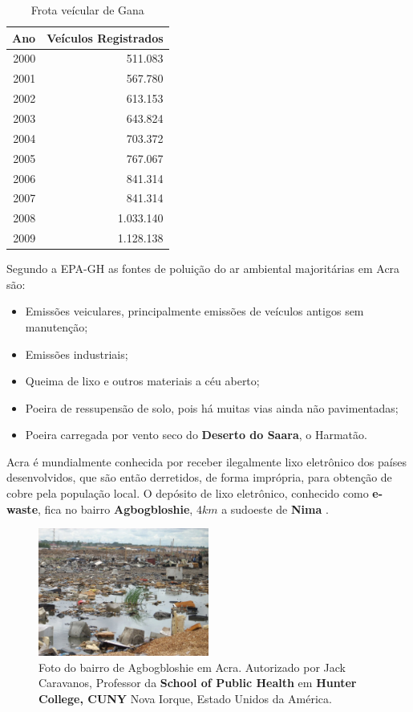 \begin{table}[H]
 \centering
  \begin{tabular}{rr}
  \hline
  Ano & Veículos Registrados \\ 
  \hline
  2000 & 511.083 \\ 
  2001 & 567.780 \\ 
  2002 & 613.153 \\ 
  2003 & 643.824 \\ 
  2004 & 703.372 \\ 
  2005 & 767.067 \\ 
  2006 & 841.314 \\ 
  2007 & 841.314 \\ 
  2008 & 1.033.140 \\ 
  2009 & 1.128.138 \\ 
  \hline
  \end{tabular}
  \caption{Frota veícular de Gana \citep{dvla} \label{table:dvla}}
\end{table}

Segundo a EPA-GH \citep{epa2015} as fontes de poluição do ar ambiental 
majoritárias em Acra são:

\begin{itemize}
 \item Emissões veiculares, principalmente emissões de veículos antigos sem 
       manutenção;
 \item Emissões industriais;
 \item Queima de lixo e outros materiais a céu aberto;
 \item Poeira de ressupensão de solo, pois há muitas vias ainda não pavimentadas;
 \item Poeira carregada por vento seco do \textbf{Deserto do Saara}, o Harmatão.
\end{itemize}

Acra é mundialmente conhecida por receber ilegalmente lixo 
eletrônico dos países desenvolvidos, que são então derretidos, de forma
imprópria, para obtenção de cobre pela população local. 
O depósito de lixo eletrônico, conhecido como \textbf{e-waste}, 
fica no bairro \textbf{Agbogbloshie}, $4 km$ a sudoeste de \textbf{Nima}
\citep{asampong2015}.

\begin{figure}[H]
  \centering
  \includegraphics[width=0.5\textwidth]{../inputs/images/ewaste_jack_caravano.jpg}
  \caption{Foto do bairro de Agbogbloshie em Acra. Autorizado por Jack Caravanos, 
           Professor da \textbf{School of Public Health} em \textbf{Hunter College, CUNY}
           Nova Iorque, Estado Unidos da América. \label{fig:ewaste}}
\end{figure}

